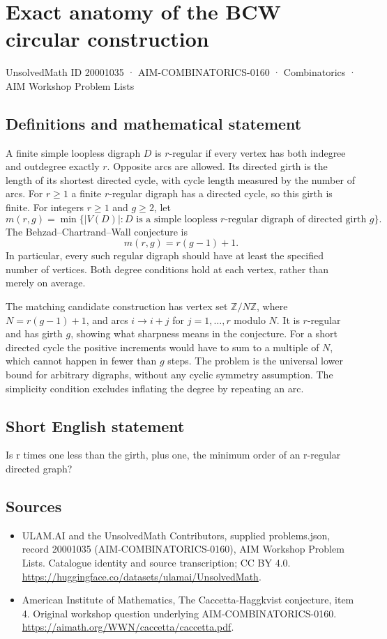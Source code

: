 \documentclass[11pt,a4paper]{article}
\begin{document}
\section*{Exact anatomy of the BCW circular construction}\label{20001035}
{\small UnsolvedMath ID 20001035 · AIM-COMBINATORICS-0160 · Combinatorics · AIM Workshop Problem Lists}
\subsection{Definitions and mathematical statement}
A finite simple loopless digraph $D$ is $r$-regular if every vertex has
both indegree and outdegree exactly $r$. Opposite arcs are allowed.
Its directed girth is the length of its shortest directed cycle, with
cycle length measured by the number of arcs. For $r\ge1$ a finite
$r$-regular digraph has a directed cycle, so this girth is finite.
For integers $r\ge1$ and $g\ge2$, let
\[
 m(r,g)=\min\{|V(D)|:D\text{ is a simple loopless }r\text{-regular
                         digraph of directed girth }g\}.
\]
The Behzad--Chartrand--Wall conjecture is
\[
                              m(r,g)=r(g-1)+1.
\]
In particular, every such regular digraph should have at least the
specified number of vertices. Both degree conditions hold at each
vertex, rather than merely on average.

The matching candidate construction has vertex set
$\mathbb Z/N\mathbb Z$, where $N=r(g-1)+1$, and arcs
$i\to i+j$ for $j=1,\ldots,r$ modulo $N$. It is $r$-regular and
has girth $g$, showing what sharpness means in the conjecture.
For a short directed cycle the positive increments would have to sum
to a multiple of $N$, which cannot happen in fewer than $g$ steps.
The problem is the universal lower bound for arbitrary digraphs,
without any cyclic symmetry assumption. The simplicity condition
excludes inflating the degree by repeating an arc.
\subsection{Short English statement}
Is r times one less than the girth, plus one, the minimum order of an r-regular directed graph?
\subsection{Sources}
\begin{itemize}
\item[S1] ULAM.AI and the UnsolvedMath Contributors, supplied problems.json, record 20001035 (AIM-COMBINATORICS-0160), AIM Workshop Problem Lists. Catalogue identity and source transcription; CC BY 4.0.
\url{https://huggingface.co/datasets/ulamai/UnsolvedMath}.
\item[S2] American Institute of Mathematics, The Caccetta-Haggkvist conjecture, item 4. Original workshop question underlying AIM-COMBINATORICS-0160.
\url{https://aimath.org/WWN/caccetta/caccetta.pdf}.
\end{itemize}
\end{document}
